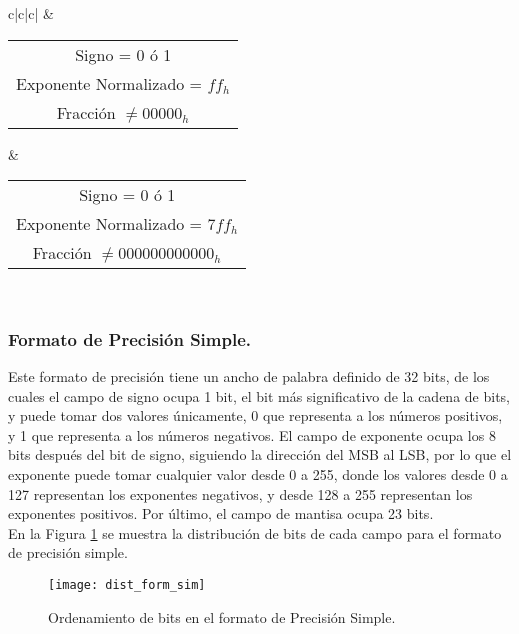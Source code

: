 \begin{table}[htb]
\begin{tabular}{c|c|c|}
 & \begin{tabular}[c]{@{}c@{}}Signo = 0 ó 1\\ Exponente Normalizado = $ff_{h}$\\  Fracción $\neq 00000_{h}$\end{tabular}                           & \begin{tabular}[c]{@{}c@{}}Signo = 0 ó 1\\ Exponente Normalizado = $7ff_{h}$ \\ Fracción $\neq 000000000000_{h}$\end{tabular}                   \\ \hline
\end{tabular}
\end{table}


\subsubsection*{Formato de Precisión Simple.}

Este formato de precisión tiene un ancho de palabra definido de 32 bits, de los cuales el campo de signo ocupa 1 bit, el bit más significativo de la cadena de bits, y puede tomar dos valores únicamente, 0 que representa a los números positivos, y 1 que representa a los números negativos. El campo de exponente ocupa los 8 bits después del bit de signo, siguiendo la dirección del MSB al LSB, por lo que el exponente puede tomar cualquier valor desde 0 a 255, donde los valores desde 0 a 127 representan los exponentes negativos, y desde 128 a 255 representan los exponentes positivos. Por último, el campo de mantisa ocupa 23 bits.\\

En la Figura \ref{fig:dist_form_sim} se muestra la distribución de bits de cada campo para el formato de precisión simple.\\

\begin{figure}[htb]
  \centering
  \texttt{[image: dist\_form\_sim]}
  \caption{Ordenamiento de bits en el formato de Precisión Simple.}
  \label{fig:dist_form_sim}
\end{figure}

